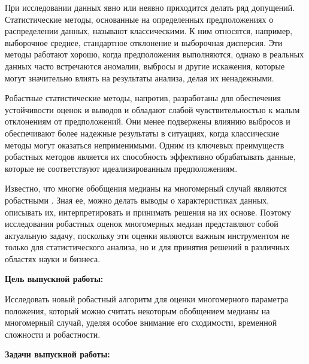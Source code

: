 \documentclass[specialist,
substylefile = spbu.rtx,
               subf,href,colorlinks=true, 12pt]{disser}
\begin{document}
При исследовании данных явно или неявно приходится делать ряд допущений. Статистические методы, основанные на определенных предположениях о распределении данных, называют классическими. К ним относятся, например, выборочное среднее, стандартное отклонение и выборочная дисперсия. Эти методы работают хорошо, когда предположения выполняются, однако в реальных данных часто встречаются аномалии, выбросы и другие искажения, которые могут значительно влиять на результаты анализа, делая их ненадежными.

Робастные статистические методы, напротив, разработаны для обеспечения устойчивости оценок и выводов и обладают слабой чувствительностью к
малым отклонениям от предположений. Они менее подвержены влиянию выбросов и обеспечивают более надежные результаты в ситуациях, когда классические методы могут оказаться неприменимыми. Одним из ключевых преимуществ робастных методов является их способность эффективно обрабатывать данные, которые не соответствуют идеализированным предположениям.



Известно, что многие обобщения медианы на многомерный случай являются робастными \cite{Robust}. Зная ее, можно делать выводы о характеристиках данных, описывать их, интерпретировать и принимать решения на их основе. Поэтому исследования робастных оценок многомерных медиан представляют собой актуальную задачу, поскольку эти оценки являются важным инструментом не только для статистического анализа, но и для принятия решений в различных областях науки и бизнеса.
\vspace{2ex}

\textbf{Цель выпускной работы:}

Исследовать новый робастный алгоритм для оценки многомерного параметра положения, который можно считать некоторым обобщением медианы на многомерный случай, уделяя особое внимание его сходимости, временной сложности и робастности. 

\newpage

\textbf{Задачи выпускной работы:}
\end{document}
